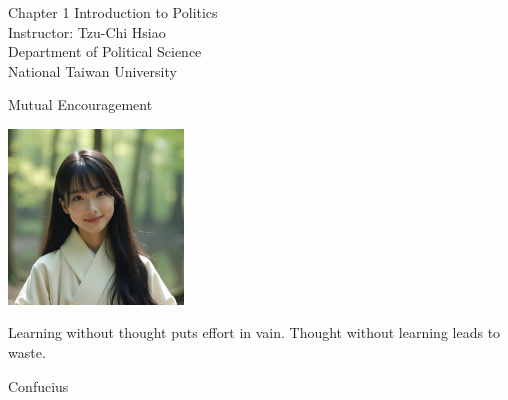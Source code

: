 \documentclass{beamer}
\title{}
\author{}
\date{}
\begin{document}
\begin{frame}
\begin{center}
\Large{Chapter 1 Introduction to Politics} \\
\vspace{3em}
\normalsize{Instructor: Tzu-Chi Hsiao} \\
\vspace{3em}
\small{Department of Political Science} \\
\vspace{1em}
\small{National Taiwan University} \\
\end{center}
\end{frame}
\begin{frame}{Mutual Encouragement}
\begin{center}
\includegraphics[width=0.35\textwidth]{mc.png}
\end{center}
\begin{center}
Learning without thought puts effort in vain. Thought without learning leads to waste. 
\end{center}
\flushright Confucius
\end{frame}
\end{document}
